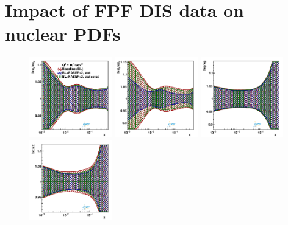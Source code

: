 \clearpage
\section{Impact of FPF DIS data on nuclear PDFs}
\label{app:nPDF_impact_appendix}


\begin{figure}[t]
\centering
\includegraphics[width=0.32\textwidth]{plots/nuclear_fasernu2/inclusive+charm_chargediscrimination/fred05fcorr05_FASERv2_q2_10000_pdf_uv_ratio.pdf}
\includegraphics[width=0.32\textwidth]{plots/nuclear_fasernu2/inclusive+charm_chargediscrimination/fred05fcorr05_FASERv2_q2_10000_pdf_dv_ratio.pdf}
\includegraphics[width=0.32\textwidth]{plots/nuclear_fasernu2/inclusive+charm_chargediscrimination/fred05fcorr05_FASERv2_q2_10000_pdf_g_ratio.pdf}\\
\includegraphics[width=0.32\textwidth]{plots/nuclear_fasernu2/inclusive+charm_chargediscrimination/fred05fcorr05_FASERv2_q2_10000_pdf_Sea_ratio.pdf}

\end{figure}
